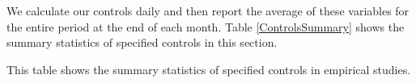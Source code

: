 We calculate our controls daily and then report the average of these variables for the entire period at the end of each month. Table \ref{ControlsSummary} shows the summary statistics of specified controls in this section.




 \begin{table}[htbp]
 \caption{\scriptsize This table shows the summary statistics of specified controls in empirical studies.}
 \label{ControlsSummary}
               \centering 
               \scriptsize
                 {
    
                 }
             \end{table}




